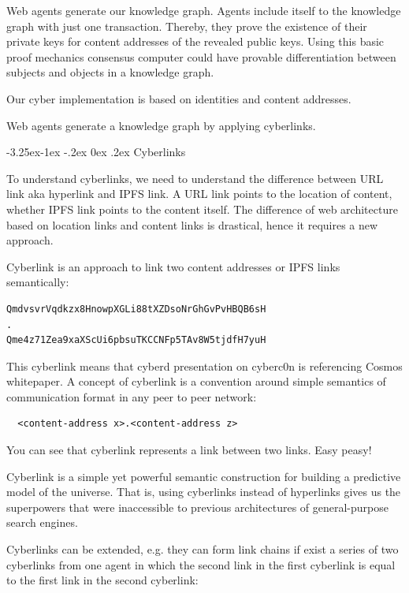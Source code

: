 \documentclass[8pt,oneside]{amsart}
\makeatletter
\newcommand{\linkred}[2]{\href{#1}{\color{red}{#2}}}
\renewcommand\subsection{\@startsection{subsection}{2}{\z@}%
                                     {-3.25ex\@plus -1ex \@minus -.2ex}%
                                     {0ex \@plus .2ex}%
                                     {\play\Large}}%
\newcommand{\titleSection}[1]{\subsection{#1}}
\newcommand{\code}[1]{{\PlayBold #1}}
\makeatother
\begin{document}
Web agents generate our knowledge graph. Agents include itself to the knowledge graph with just one transaction. Thereby, they prove the existence of their private keys for content addresses of the revealed public keys. Using this basic proof mechanics consensus computer could have provable differentiation between subjects and objects in a knowledge graph.

Our \code{cyber} implementation is based on \linkred{https://github.com/cosmos/cosmos-sdk}{cosmos-sdk} identities and \linkred{https://github.com/multiformats/cid#cidv0}{cidv1} content addresses.

Web agents generate a knowledge graph by applying \code{cyberlinks}.

\titleSection{Cyberlinks}\label{cyberlinks}

To understand cyberlinks, we need to understand the difference between \code{URL link} aka hyperlink and \code{IPFS link}. A URL link points to the location of content, whether  IPFS link points to the content itself. The difference of web architecture based on location links and content links is drastical, hence it requires a new approach.

\code{Cyberlink} is an approach to link two content addresses or \code{IPFS links} semantically:

\begin{lstlisting}
QmdvsvrVqdkzx8HnowpXGLi88tXZDsoNrGhGvPvHBQB6sH
.
Qme4z71Zea9xaXScUi6pbsuTKCCNFp5TAv8W5tjdfH7yuH
\end{lstlisting}

This cyberlink means that cyberd presentation on cyberc0n is referencing Cosmos whitepaper. A concept of cyberlink is a convention around simple semantics of communication format in any peer to peer network:

\begin{lstlisting}
  <content-address x>.<content-address z>
\end{lstlisting}

You can see that cyberlink represents a link between two links. Easy peasy!

Cyberlink is a simple yet powerful semantic construction for building a predictive model of the universe. That is, using cyberlinks instead of hyperlinks gives us the superpowers that were inaccessible to previous architectures of general-purpose search engines.

Cyberlinks can be extended, e.g. they can form link chains if exist a series of two cyberlinks from one agent in which the second link in the first cyberlink is equal to the first link in the second cyberlink:
\end{document}
